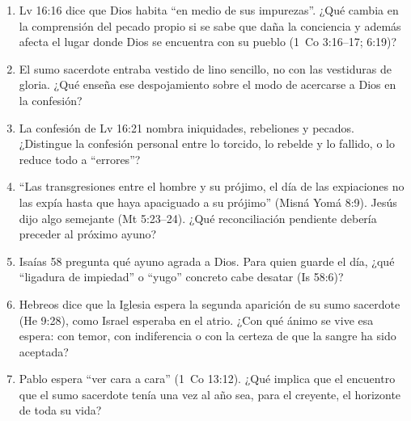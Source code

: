 \documentclass[11pt,letterpaper]{article}
\begin{document}
\begin{enumerate}\setlength{\itemsep}{4pt}
\item Lv 16:16 dice que Dios habita ``en medio de sus impurezas''. ¿Qué cambia en la comprensión del pecado propio si se sabe que daña la conciencia y además afecta el lugar donde Dios se encuentra con su pueblo (1~Co 3:16--17; 6:19)?
\item El sumo sacerdote entraba vestido de lino sencillo, no con las vestiduras de gloria. ¿Qué enseña ese despojamiento sobre el modo de acercarse a Dios en la confesión?
\item La confesión de Lv 16:21 nombra iniquidades, rebeliones y pecados. ¿Distingue la confesión personal entre lo torcido, lo rebelde y lo fallido, o lo reduce todo a ``errores''?
\item ``Las transgresiones entre el hombre y su prójimo, el día de las expiaciones no las expía hasta que haya apaciguado a su prójimo'' (Misná Yomá 8:9). Jesús dijo algo semejante (Mt 5:23--24). ¿Qué reconciliación pendiente debería preceder al próximo ayuno?
\item Isaías 58 pregunta qué ayuno agrada a Dios. Para quien guarde el día, ¿qué ``ligadura de impiedad'' o ``yugo'' concreto cabe desatar (Is 58:6)?
\item Hebreos dice que la Iglesia espera la segunda aparición de su sumo sacerdote (He 9:28), como Israel esperaba en el atrio. ¿Con qué ánimo se vive esa espera: con temor, con indiferencia o con la certeza de que la sangre ha sido aceptada?
\item Pablo espera ``ver cara a cara'' (1~Co 13:12). ¿Qué implica que el encuentro que el sumo sacerdote tenía una vez al año sea, para el creyente, el horizonte de toda su vida?
\end{enumerate}

\end{document}

